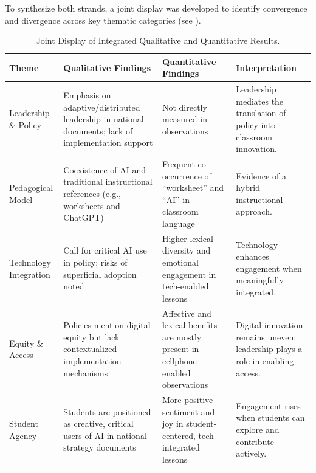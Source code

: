 \documentclass[english]{textolivre}
\begin{document}
To synthesize both strands, a joint display was developed to identify convergence and divergence across key thematic categories (see ).

\begin{table}[htbp]
\centering
\begin{threeparttable}
\caption{Joint Display of Integrated Qualitative and Quantitative Results.}
\label{tab3}

\footnotesize

\begin{tabularx}{\textwidth}{
>{\raggedright\arraybackslash}p{}
X
>{\raggedright\arraybackslash}p{}
>{\raggedright\arraybackslash}p{}}
\toprule
\textbf{Theme} &
\textbf{Qualitative Findings} &
\textbf{Quantitative Findings} &
\textbf{Interpretation} \\
\midrule

Leadership \& Policy &
Emphasis on adaptive/distributed leadership in national documents; lack of implementation support &
Not directly measured in observations &
Leadership mediates the translation of policy into classroom innovation. \\
\midrule

Pedagogical Model &
Coexistence of AI and traditional instructional references (e.g., worksheets and ChatGPT) &
Frequent co-occurrence of ``worksheet'' and ``AI'' in classroom language &
Evidence of a hybrid instructional approach. \\
\midrule

Technology Integration &
Call for critical AI use in policy; risks of superficial adoption noted &
Higher lexical diversity and emotional engagement in tech-enabled lessons &
Technology enhances engagement when meaningfully integrated. \\
\midrule

Equity \& Access &
Policies mention digital equity but lack contextualized implementation mechanisms &
Affective and lexical benefits are mostly present in cellphone-enabled observations &
Digital innovation remains uneven; leadership plays a role in enabling access. \\
\midrule

Student Agency &
Students are positioned as creative, critical users of AI in national strategy documents &
More positive sentiment and joy in student-centered, tech-integrated lessons &
Engagement rises when students can explore and contribute actively. \\

\bottomrule
\end{tabularx}
\end{threeparttable}
\end{table}
\end{document}
